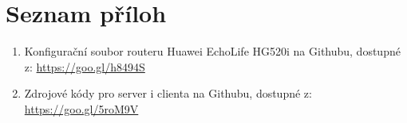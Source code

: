 \documentclass[a4paper,12pt, twoside]{article} %
\begin{document}
\section*{Seznam příloh} 
\begin{enumerate}[{Příloha} 1:]
\item \label{priloha:github_router_conf} Konfigurační soubor routeru Huawei EchoLife HG520i na Githubu, dostupné z: \href{https://goo.gl/h8494S}{https://goo.gl/h8494S}
\item \label{priloha:github_zdrojovy_kod} Zdrojové kódy pro server i clienta na Githubu, dostupné z: \href{https://goo.gl/5roM9V}{https://goo.gl/5roM9V}
\end{enumerate}
\end{document}
